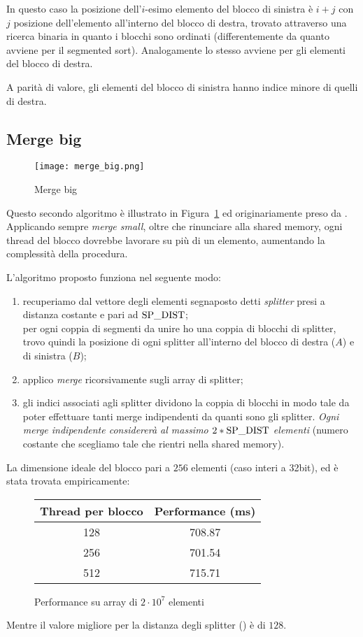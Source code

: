 In questo caso la posizione dell'$i$-esimo elemento del blocco di sinistra è $i+j$ con $j$ posizione dell'elemento all'interno del blocco di destra, trovato attraverso una ricerca binaria in quanto i blocchi sono ordinati (differentemente da quanto avviene per il segmented sort). Analogamente lo stesso avviene per gli elementi del blocco di destra. 

A parità di valore, gli elementi del blocco di sinistra hanno indice minore di quelli di destra. 

\subsection{Merge big}

\begin{figure}[t]
    \centering
	\texttt{[image: merge\_big.png]}
	\caption{Merge big}
	\label{merge_big}
\end{figure}

Questo secondo algoritmo è illustrato in Figura~\ref{merge_big} ed originariamente preso da \cite{mergebig}. Applicando sempre \emph{merge small}, oltre che rinunciare alla shared memory, ogni thread del blocco dovrebbe lavorare su più di un elemento, aumentando la complessità della procedura. 

L'algoritmo proposto funziona nel seguente modo:
\begin{enumerate}
    \item recuperiamo dal vettore degli elementi segnaposto detti \emph{splitter} presi a distanza costante e pari ad $\textrm{SP\_DIST}$; \\
    per ogni coppia di segmenti da unire ho una coppia di blocchi di splitter, trovo quindi la posizione di ogni splitter all'interno del blocco di destra ($A$) e di sinistra ($B$);
    \item applico \emph{merge} ricorsivamente sugli array di splitter;
    \item gli indici associati agli splitter dividono la coppia di blocchi in modo tale da poter effettuare tanti merge indipendenti da quanti sono gli splitter. \emph{Ogni merge indipendente considererà al massimo $2* \textrm{SP\_DIST}$ elementi} (numero costante che scegliamo tale che rientri nella shared memory).
\end{enumerate}

La dimensione ideale del blocco pari a $256$ elementi (caso interi a 32bit), ed è stata trovata empiricamente:
\begin{figure}[H]
	\centering
	\begin{tabular}{SS}
		\toprule
		\textbf{Thread per blocco} & \textbf{Performance (\si{\milli\second})} \\   & 708.87  \\	
		256  & 701.54 \\
		512  & 715.71 \\ \bottomrule
	\end{tabular}
	\caption{Performance su array di $2\cdot 10^7$ elementi}
\end{figure}
Mentre il valore migliore per la distanza degli splitter (\SplitterDistance) è di $ 128 $.


